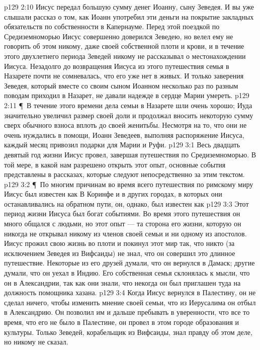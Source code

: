 \vs p129 2:10 Иисус передал большую сумму денег Иоанну, сыну Зеведея. И вы уже слышали рассказ о том, как Иоанн употребил эти деньги на покрытие закладных обязательств по собственности в Капернауме. Перед этой поездкой по Средиземноморью Иисус совершенно доверился Зеведею, но велел ему не говорить об этом никому, даже своей собственной плоти и крови, и в течение этого двухлетнего периода Зеведей никому не рассказывал о местонахождении Иисуса. Незадолго до возвращения Иисуса из этого путешествия семья в Назарете почти не сомневалась, что его уже нет в живых. И только заверения Зеведея, который вместе со своим сыном Иоанном несколько раз по разным поводам приходил в Назарет, не давали надежде в сердце Марии умереть.
\vs p129 2:11 \P\ В течение этого времени дела семьи в Назарете шли очень хорошо; Иуда значительно увеличил размер своей доли и продолжал вносить некоторую сумму сверх обычного взноса вплоть до своей женитьбы. Несмотря на то, что они не очень нуждались в помощи, Иоанн Зеведеев, выполняя распоряжение Иисуса, каждый месяц привозил подарки для Марии и Руфи.
\vs p129 3:1 Весь двадцать девятый год жизни Иисус провел, завершая путешествия по Средиземноморью. В той мере, в какой нам разрешено открыть этот опыт, основные события представлены в рассказах, которые следуют непосредственно за этим текстом.
\vs p129 3:2 \P\ По многим причинам во время всего путешествия по римскому миру Иисус был известен как  В Коринфе и в других городах, в которых они останавливались на обратном пути, он, однако, был известен как 
\vs p129 3:3 Этот период жизни Иисуса был богат событиями. Во время этого путешествия он много общался с людьми, но этот опыт --- та сторона его жизни, которую он никогда не открывал никому из членов своей семьи и ни одному из апостолов. Иисус прожил свою жизнь во плоти и покинул этот мир так, что никто (за исключением Зеведея из Вифсаиды) не знал, что он совершил это длинное путешествие. Некоторые из его друзей думали, что он вернулся в Дамаск; другие думали, что он уехал в Индию. Его собственная семья склонялась к мысли, что он в Александрии, так как они знали, что некогда он был приглашен туда на должность помощника хазана.
\vs p129 3:4 Когда Иисус вернулся в Палестину, он не сделал ничего, чтобы изменить мнение своей семьи, что из Иерусалима он отбыл в Александрию. Он позволил им и дальше пребывать в уверенности, что все то время, что его не было в Палестине, он провел в этом городе образования и культуры. Только Зеведей, корабельщик из Вифсаиды, знал правду об этом деле, но никому не сказал.
